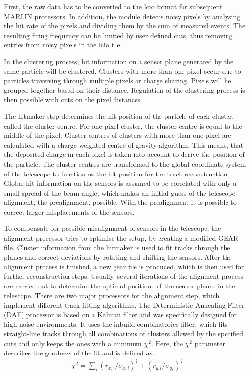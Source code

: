 First, the raw data has to be converted to the lcio format for subsequent MARLIN processors. In addition, the module detects noisy pixels by analysing the
hit rate of the pixels and dividing them by the sum of measured events. The resulting firing frequency can be limited by user defined cuts, thus removing entries
from noisy pixels in the lcio file.

In the clustering process, hit information on a sensor plane generated by the same particle will be clustered. Clusters with more than one pixel occur due to
particles traversing through multiple pixels or charge sharing. Pixels will be grouped together based on their distance.
Regulation of the clustering process is then possible with cuts on the pixel distances.

The hitmaker step determines the hit position of the particle of each cluster, called the cluster centre. For one pixel cluster, the cluster centre is equal to the middle of
the pixel. Cluster centres of clusters with more than one pixel are calculated with a charge-weighted centre-of-gravity algorithm. This means, that
the deposited charge in each pixel is taken into account to derive the position of the particle. The cluster centres are transformed to the global coordinate
system of the telescope to function as the hit position for the track reconstruction. Global hit information on the sensors is assumed to be correlated with only
a small spread of the beam angle, which makes an initial guess of the telescope alignment, the prealignment, possible. With the prealignment it is possible
to correct larger misplacements of the sensors.

To compensate for possible misalignment of sensors in the telescope, the alignment processor tries to optimise the setup, by creating a modified GEAR file.
Cluster information from the hitmaker
is used to fit tracks through the planes and correct deviations by rotating and shifting the sensors. After the alignment process is finished, a new gear file is produced, which
is then used for further reconstruction steps. Usually, several iterations of the alignment process are carried out to determine the optimal positions of the sensor planes
in the telescope.
There are two major processors for the alignment step, which implement different track fitting algorithms.
The Deterministic Annealing Filter (DAF) processor is based on a Kalman filter and was specifically designed for high noise environments. It uses the inbuild combinatorics filter, which fits
straight-line tracks through all combinations of clusters allowed by the specified cuts and only keeps the ones with a minimum $\chi^2$. Here, the $\chi^2$ parameter
describes the goodness of the fit and is defined as:
\begin{align} \label{eqn:chi}
  \chi^2 = \sum_i (r_{x,i}/\sigma_{x,i})^2 + (r_{y,i}/\sigma_{y,})^2
\end{align}

